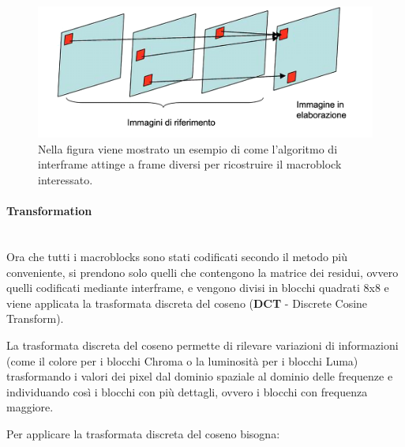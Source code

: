 \documentclass[a4paper,12pt, oneside]{article}
\begin{document}
\begin{figure}[h]
    \centering
    \includegraphics[width=1\textwidth]{images/interframe.png}
    \caption{Nella figura viene mostrato un esempio di come l'algoritmo di interframe
    attinge a frame diversi per ricostruire il macroblock interessato.}
    \label{fig:interframe}
\end{figure}

\paragraph{Transformation}\hphantom{A}\\
Ora che tutti i macroblocks sono stati codificati secondo il metodo più conveniente, si prendono solo quelli che contengono
la matrice dei residui, ovvero quelli codificati mediante interframe, e vengono divisi in blocchi quadrati 8x8
e viene applicata la trasformata discreta del coseno (\textbf{DCT} - Discrete Cosine Transform).

La trasformata discreta del coseno permette di rilevare variazioni di informazioni (come il colore per
i blocchi Chroma o la luminosità per i blocchi Luma) trasformando i valori dei pixel dal dominio
spaziale al dominio delle frequenze e individuando così i blocchi con più dettagli, ovvero i blocchi
con frequenza maggiore.

Per applicare la trasformata discreta del coseno bisogna:
\end{document}
